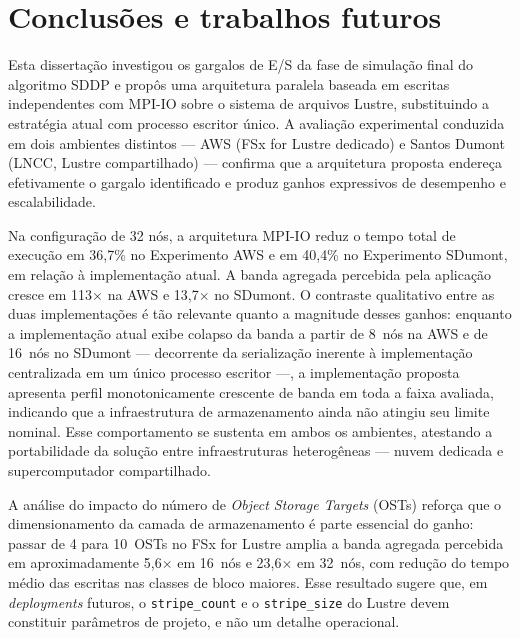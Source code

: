 \chapter{Conclusões e trabalhos futuros}
\label{cap:conclusao}

Esta dissertação investigou os gargalos de E/S da fase de simulação
final do algoritmo SDDP e propôs uma arquitetura paralela baseada em
escritas independentes com MPI-IO sobre o sistema de arquivos
Lustre, substituindo a estratégia atual com processo escritor único.
A avaliação experimental conduzida em dois ambientes distintos ---
AWS (FSx for Lustre dedicado) e Santos Dumont (LNCC, Lustre
compartilhado) --- confirma que a arquitetura proposta endereça
efetivamente o gargalo identificado e produz ganhos expressivos de
desempenho e escalabilidade.

Na configuração de 32 nós, a arquitetura MPI-IO reduz o tempo total
de execução em 36{,}7\% no Experimento AWS e em 40{,}4\% no Experimento
SDumont, em relação à implementação atual. A banda agregada
percebida pela aplicação cresce em 113$\times$ na AWS e
13,7$\times$ no SDumont. O contraste qualitativo entre as duas
implementações é tão relevante quanto a magnitude desses ganhos:
enquanto a implementação atual exibe colapso da banda a partir de
8~nós na AWS e de 16~nós no SDumont --- decorrente da serialização
inerente à implementação centralizada em um único processo escritor ---, a implementação proposta apresenta perfil
monotonicamente crescente de banda em toda a faixa avaliada,
indicando que a infraestrutura de armazenamento ainda não atingiu
seu limite nominal. Esse comportamento se sustenta em ambos os
ambientes, atestando a portabilidade da solução entre
infraestruturas heterogêneas --- nuvem dedicada e supercomputador
compartilhado.

A análise do impacto do número de \textit{Object Storage Targets}
(OSTs) reforça que o dimensionamento da camada de armazenamento é
parte essencial do ganho: passar de 4 para 10~OSTs no FSx for
Lustre amplia a banda agregada percebida em aproximadamente
5,6$\times$ em 16~nós e 23,6$\times$ em 32~nós, com redução do
tempo médio das escritas nas classes de bloco maiores. Esse
resultado sugere que, em \textit{deployments} futuros, o
\texttt{stripe\_count} e o \texttt{stripe\_size} do Lustre devem
constituir parâmetros de projeto, e não um detalhe
operacional.

